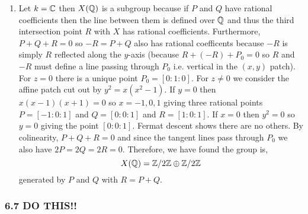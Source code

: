 \documentclass[12pt]{article}
\begin{document}
\begin{enumerate}
\item Let $k = \mathbb{C}$ then $X(\mathbb{Q})$ is a subgroup because if $P$ and $Q$ have rational coefficients then the line between them is defined over $\mathbb{Q}$ and thus the third intersection point $R$ with $X$ has rational coefficients. Furthermore, $P + Q + R = 0$ so $-R = P + Q$ also has rational coefficents because $-R$ is simply $R$ reflected along the $y$-axis (because $R + (-R) + P_0 = 0$ so $R$ and $-R$ must define a line passing through $P_0$ i.e. vertical in the $(x,y)$ patch). 
\bigskip\\
For $z = 0$ there is a unique point $P_0 = [0:1:0]$. For $z \neq 0$ we consider the affine patch cut out by $y^2 = x(x^2 - 1)$. If $y = 0$ then $x(x - 1)(x + 1) = 0$ so $x = -1, 0, 1$ giving three rational points $P = [-1 : 0 : 1]$ and $Q = [0 : 0 : 1]$ and $R = [1 : 0 : 1]$. If $x = 0$ then $y^2 = 0$ so $y = 0$ giving the point $[0 : 0 : 1]$. Fermat descent shows there are no others. By colinearity, $P + Q + R = 0$ and since the tangent lines pass through $P_0$ we also have $2 P = 2 Q = 2 R = 0$. Therefore, we have found the group is,
\[ X(\mathbb{Q}) = \mathbb{Z} / 2 \mathbb{Z} \oplus \mathbb{Z} / 2 \mathbb{Z} \]
generated by $P$ and $Q$ with $R = P + Q$.
\end{enumerate}

\subsubsection{6.7 DO THIS!!}
\end{document}
